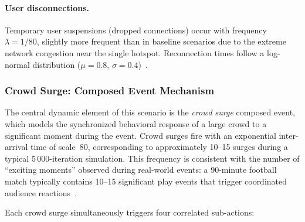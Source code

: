 \paragraph{User disconnections.} Temporary user suspensions (dropped connections) occur with frequency $\lambda = 1/80$, slightly more frequent than in baseline scenarios due to the extreme network congestion near the single hotspot. Reconnection times follow a log-normal distribution ($\mu = 0.8$, $\sigma = 0.4$)~\cite{Haibeh2022A}.

\subsubsection{Crowd Surge: Composed Event Mechanism}

The central dynamic element of this scenario is the \emph{crowd surge} composed event, which models the synchronized behavioral response of a large crowd to a significant moment during the event. Crowd surges fire with an exponential inter-arrival time of scale~80, corresponding to approximately 10--15 surges during a typical 5\,000-iteration simulation. This frequency is consistent with the number of ``exciting moments'' observed during real-world events: a 90-minute football match typically contains 10--15 significant play events that trigger coordinated audience reactions~\cite{Pujol2015Understanding}.

Each crowd surge simultaneously triggers four correlated sub-actions:

